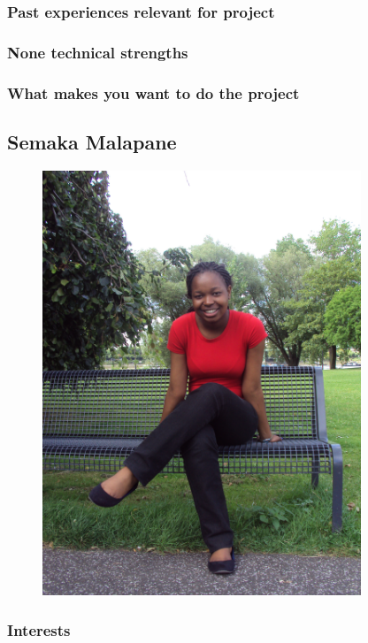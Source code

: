 \documentclass[hidelinks, 12pt, oneside]{article}
\begin{document}
\subsubsection{Past experiences relevant for project}
\subsubsection{None technical strengths}
\subsubsection{What makes you want to do the project}

\subsection{Semaka Malapane}

\begin{figure}[ht!]
  \centering
    \includegraphics[width=0.85\textwidth]{Semaka} 
\end{figure}

\subsubsection{Interests}
\end{document}
